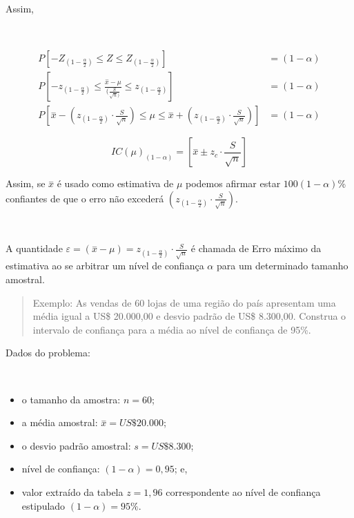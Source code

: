 \documentclass[
]{book}
\providecommand{\tightlist}{%
  \setlength{\itemsep}{0pt}\setlength{\parskip}{0pt}}
\begin{document}
\hfill\break

Assim,

~

\begin{align*}
P\left[-{Z}_{(1-\frac{\alpha }{2})}\le Z \le {Z }_{(1-\frac{\alpha }{2})}\right] & = (1-\alpha) \\
P\left[-{z}_{(1-\frac{\alpha }{2})}\le \frac{\stackrel{-}{x}-\mu }{(\frac{S}{\sqrt{n})}}
\le {z}_{(1-\frac{\alpha }{2})}\right] & = (1-\alpha) \\
P[\stackrel{-}{x}-({z}_{(1-\frac{\alpha }{2})} \cdot \frac{S}{\sqrt{n}}) \le \mu \le \stackrel{-}{x}+({z}_{(1-\frac{\alpha }{2})} \cdot \frac{S}{\sqrt{n}})     ] & = (1-\alpha) 
\end{align*}

\hfill\break

\[
IC(\mu)_{(1-\alpha)} = [\stackrel{-}{x} \pm {z}_{c} \cdot \frac{S}{\sqrt{n}} ] 
\]

\hfill\break

Assim, se \(\stackrel{-}{x}\) é usado como estimativa de \(\mu\) podemos afirmar estar \(100(1-\alpha)\)\% confiantes de que o erro não excederá \(({z}_{(1-\frac{\alpha }{2})} \cdot \frac{S}{\sqrt{n}})\).

~

A quantidade \(\varepsilon=(\stackrel{-}{x}-\mu)={z}_{(1-\frac{\alpha }{2})} \cdot \frac{S}{\sqrt{n}}\) é chamada de Erro máximo da estimativa ao se arbitrar um nível de confiança \(\alpha\) para um determinado tamanho amostral.

\hfill\break

\begin{quote}
Exemplo: As vendas de 60 lojas de uma região do país apresentam uma média igual a US\$ 20.000,00 e desvio padrão de US\$ 8.300,00. Construa o intervalo de confiança para a média ao nível de confiança de 95\%.
\end{quote}

\hfill\break

Dados do problema:

~

\begin{itemize}
\tightlist
\item
  o tamanho da amostra: \(n=60\);\\
\item
  a média amostral: \(\stackrel{-}{x}=US\$ 20.000\);\\
\item
  o desvio padrão amostral: \(s=US\$ 8.300\);\\
\item
  nível de confiança: \((1-\alpha)=0,95\); e,
\item
  valor extraído da tabela \(z=1,96\) correspondente ao nível de confiança estipulado \((1-\alpha)=95\%\).
\end{itemize}
\end{document}
